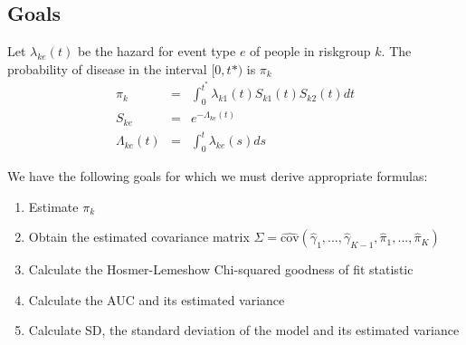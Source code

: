\documentclass[11pt]{article}
\begin{document}


\subsection{Goals }
Let $\lambda_{ke}(t)$ be the hazard for event type $e$ of people in
riskgroup $k$. The probability of disease in the interval $[0,t*)$ is $\pi_k$
\begin{eqnarray}
\pi_k & = & \int_{0}^{t^*} \lambda_{k1}(t)S_{k1}(t)S_{k2}(t)dt \\
S_{ke} & = & e^{-\Lambda_{ke}(t)} \\
\Lambda_{ke}(t) & = & \int_0^t \lambda_{ke}(s)ds
\end{eqnarray}

We have the following goals for which we must derive appropriate formulas:
\begin{enumerate} 
  \item Estimate $\pi_k$
  \item Obtain the estimated covariance 
            matrix $\Sigma =
            \widehat{\mbox{cov}}(\hat{\gamma}_1, ..., \hat{\gamma}_{K-1}, \hat{\pi}_1,...,\hat{\pi}_K)$
  \item Calculate the Hosmer-Lemeshow Chi-squared goodness of fit statistic
  \item Calculate the AUC and its estimated variance
  \item Calculate SD, the standard deviation of the model and its
    estimated variance


\end{enumerate}
\end{document}
